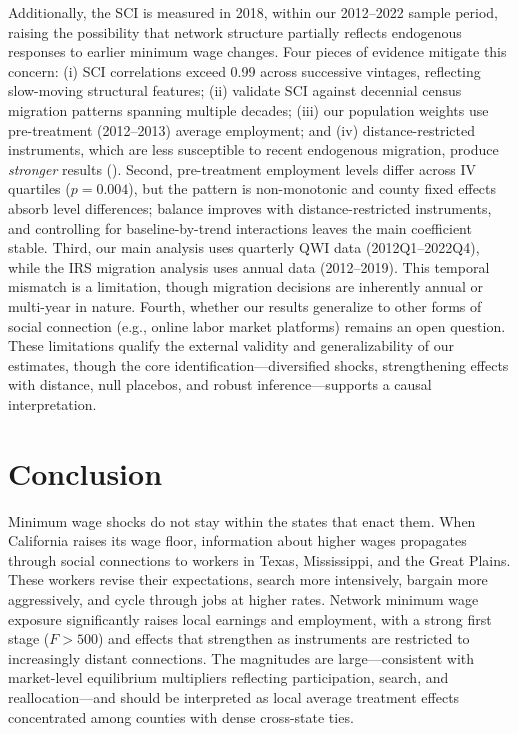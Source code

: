 \documentclass[12pt]{article}
\begin{document}
Additionally, the SCI is measured in 2018, within our 2012--2022 sample period, raising the possibility that network structure partially reflects endogenous responses to earlier minimum wage changes. Four pieces of evidence mitigate this concern: (i) SCI correlations exceed 0.99 across successive vintages, reflecting slow-moving structural features; (ii) \citet{bailey2020social} validate SCI against decennial census migration patterns spanning multiple decades; (iii) our population weights use pre-treatment (2012--2013) average employment; and (iv) distance-restricted instruments, which are less susceptible to recent endogenous migration, produce \textit{stronger} results (). Second, pre-treatment employment levels differ across IV quartiles ($p = 0.004$), but the pattern is non-monotonic and county fixed effects absorb level differences; balance improves with distance-restricted instruments, and controlling for baseline-by-trend interactions leaves the main coefficient stable. Third, our main analysis uses quarterly QWI data (2012Q1--2022Q4), while the IRS migration analysis uses annual data (2012--2019). This temporal mismatch is a limitation, though migration decisions are inherently annual or multi-year in nature. Fourth, whether our results generalize to other forms of social connection (e.g., online labor market platforms) remains an open question. These limitations qualify the external validity and generalizability of our estimates, though the core identification---diversified shocks, strengthening effects with distance, null placebos, and robust inference---supports a causal interpretation.


\section{Conclusion}
\label{sec:conclusion}

Minimum wage shocks do not stay within the states that enact them. When California raises its wage floor, information about higher wages propagates through social connections to workers in Texas, Mississippi, and the Great Plains. These workers revise their expectations, search more intensively, bargain more aggressively, and cycle through jobs at higher rates. Network minimum wage exposure significantly raises local earnings and employment, with a strong first stage ($F > 500$) and effects that strengthen as instruments are restricted to increasingly distant connections. The magnitudes are large---consistent with market-level equilibrium multipliers reflecting participation, search, and reallocation---and should be interpreted as local average treatment effects concentrated among counties with dense cross-state ties.
\end{document}

